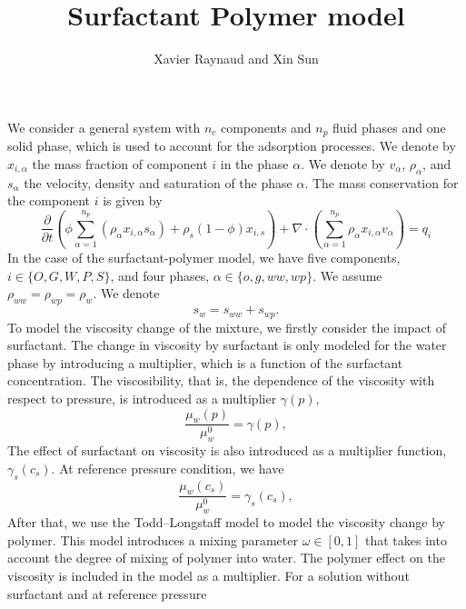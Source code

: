 \documentclass[11pt]{amsart}
\newcommand{\dive}{\nabla\cdot}
\newcommand{\fracpar}[2]{\frac{\partial #1}{\partial #2}}
\begin{document}
\title[Surfactant Polymer model]{Surfactant Polymer model}
\author{Xavier Raynaud and Xin Sun}

\maketitle


We consider a general system with $n_c$ components and $n_p$ fluid phases and one solid phase, which is used to account for the adsorption processes. We denote by $x_{i,\alpha}$ the mass fraction of component $i$ in the phase $\alpha$. We denote by $v_\alpha$, $\rho_\alpha$, and $s_\alpha$ the velocity, density and saturation of the phase $\alpha$. The mass conservation for the component $i$ is given by
\begin{equation}
  \label{eq:massconsgen}
  \fracpar{}{t}(\phi \sum_{\alpha = 1}^{n_p}(\rho_\alpha x_{i,\alpha}s_\alpha) + \rho_s(1 - \phi)x_{i,s}) + \dive(\sum_{\alpha = 1}^{n_p}\rho_\alpha x_{i,\alpha}v_\alpha) = q_i
\end{equation}
In the case of the surfactant-polymer model, we have five components, $i\in\{O, G, W, P, S\}$, and
four phases, $\alpha\in\{o, g, ww, wp\}$. We assume $\rho_{ww}=\rho_{wp}=\rho_{w}$. We denote
\begin{equation*}
  s_w = s_{ww} + s_{wp}.
\end{equation*}
To model the viscosity change of the mixture, we firstly consider the impact of
surfactant. The change in viscosity by surfactant is only modeled for the water
phase by introducing a multiplier, which is a function of the surfactant
concentration. The viscosibility, that is, the dependence of the viscosity with
respect to pressure, is introduced as a multiplier $\gamma(p)$,
\begin{equation}
  \label{eq:defmuw}
  \frac{\mu_w(p)}{\mu_w^0} = \gamma(p),
\end{equation}
The effect of surfactant on viscosity is also introduced as a multiplier
function, $\gamma_s(c_s)$.  At reference pressure condition, we have
\begin{equation}
  \label{eq:defmuw}
  \frac{\mu_w(c_s)}{\mu_w^0} = \gamma_{s}(c_s),
\end{equation}
After that, we use the Todd--Longstaff model \cite{TL72:jpt} to model the
viscosity change by polymer. This model introduces a mixing parameter
$\omega\in[0, 1]$ that takes into account the degree of mixing of polymer into
water. The polymer effect on the viscosity is included in the model as a
multiplier. For a solution without surfactant and at reference pressure
\end{document}
